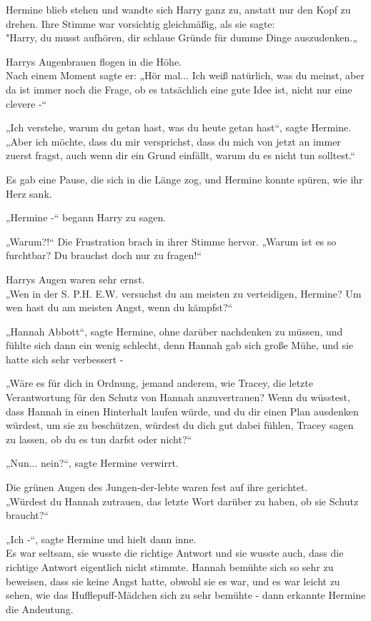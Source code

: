 {Hermine blieb stehen und wandte sich Harry ganz zu, anstatt nur den Kopf zu drehen. Ihre Stimme war vorsichtig gleichmäßig, als sie sagte:\\ "Harry, du musst aufhören, dir schlaue Gründe für dumme Dinge auszudenken.„

Harrys Augenbrauen flogen in die Höhe.\\ Nach einem Moment sagte er: „Hör mal... Ich weiß natürlich, was du meinst, aber da ist immer noch die Frage, ob es tatsächlich eine gute Idee ist, nicht nur eine clevere -“

„Ich verstehe, warum du getan hast, was du heute getan hast“, sagte Hermine. „Aber ich möchte, dass du mir versprichst, dass du mich von jetzt an immer zuerst fragst, auch wenn dir ein Grund einfällt, warum du es nicht tun solltest.“

Es gab eine Pause, die sich in die Länge zog, und Hermine konnte spüren, wie ihr Herz sank.

„Hermine -“ begann Harry zu sagen.

„Warum?!“ Die Frustration brach in ihrer Stimme hervor. „Warum ist es so furchtbar? Du brauchst doch nur zu fragen!“

Harrys Augen waren sehr ernst.\\ „Wen in der S. P.H. E.W. versuchst du am meisten zu verteidigen, Hermine? Um wen hast du am meisten Angst, wenn du kämpfst?“

„Hannah Abbott“, sagte Hermine, ohne darüber nachdenken zu müssen, und fühlte sich dann ein wenig schlecht, denn Hannah gab sich große Mühe, und sie hatte sich sehr verbessert -

„Wäre es für dich in Ordnung, jemand anderem, wie Tracey, die letzte Verantwortung für den Schutz von Hannah anzuvertrauen? Wenn du wüsstest, dass Hannah in einen Hinterhalt laufen würde, und du dir einen Plan ausdenken würdest, um sie zu beschützen, würdest du dich gut dabei fühlen, Tracey sagen zu lassen, ob du es tun darfst oder nicht?“

„Nun... nein?“, sagte Hermine verwirrt.

Die grünen Augen des Jungen-der-lebte waren fest auf ihre gerichtet.\\ „Würdest du Hannah zutrauen, das letzte Wort darüber zu haben, ob sie Schutz braucht?“

„Ich -“, sagte Hermine und hielt dann inne.\\ Es war seltsam, sie wusste die richtige Antwort und sie wusste auch, dass die richtige Antwort eigentlich nicht stimmte. Hannah bemühte sich so sehr zu beweisen, dass sie keine Angst hatte, obwohl sie es war, und es war leicht zu sehen, wie das Hufflepuff-Mädchen sich zu sehr bemühte - dann erkannte Hermine die Andeutung.

}
